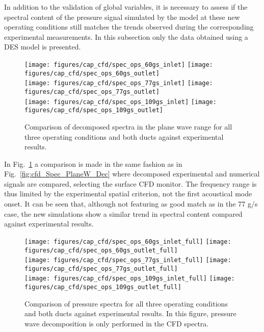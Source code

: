 In addition to the validation of global variables, it is necessary to assess if the spectral content of the pressure signal simulated by the model at these new operating conditions still matches the trends observed during the corresponding experimental measurements. In this subsection only the data obtained using a DES model is presented.

\begin{figure}[htb!]
\centering
\texttt{[image: figures/cap\_cfd/spec\_ops\_60gs\_inlet]}
\texttt{[image: figures/cap\_cfd/spec\_ops\_60gs\_outlet]}\\[4mm]
\texttt{[image: figures/cap\_cfd/spec\_ops\_77gs\_inlet]}
\texttt{[image: figures/cap\_cfd/spec\_ops\_77gs\_outlet]}\\[4mm]
\texttt{[image: figures/cap\_cfd/spec\_ops\_109gs\_inlet]}
\texttt{[image: figures/cap\_cfd/spec\_ops\_109gs\_outlet]}
\caption{Comparison of decomposed spectra in the plane wave range for all three operating conditions and both ducts against experimental results.}
\label{fig:cfd_ops_spec_all_PW}
\end{figure}

In Fig.~\ref{fig:cfd_ops_spec_all_PW} a comparison is made in the same fashion as in Fig.~\ref{fig:cfd_Spec_PlaneW_Dec} where decomposed experimental and numerical signals are compared, selecting the surface CFD monitor. The frequency range is thus limited by the experimental spatial criterion, not the first acoustical mode onset. It can be seen that, although not featuring as good match as in the 77 g/s case, the new simulations show a similar trend in spectral content compared against experimental results. 

\begin{figure}[htb!]
\centering
\texttt{[image: figures/cap\_cfd/spec\_ops\_60gs\_inlet\_full]}
\texttt{[image: figures/cap\_cfd/spec\_ops\_60gs\_outlet\_full]}\\[4mm]
\texttt{[image: figures/cap\_cfd/spec\_ops\_77gs\_inlet\_full]}
\texttt{[image: figures/cap\_cfd/spec\_ops\_77gs\_outlet\_full]}\\[4mm]
\texttt{[image: figures/cap\_cfd/spec\_ops\_109gs\_inlet\_full]}
\texttt{[image: figures/cap\_cfd/spec\_ops\_109gs\_outlet\_full]}
\caption{Comparison of pressure spectra for all three operating conditions and both ducts against experimental results. In this figure, pressure wave decomposition is only performed in the CFD spectra.}
\label{fig:cfd_ops_spec_all_full}
\end{figure}

